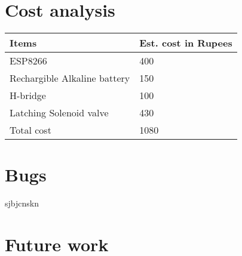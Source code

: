 \documentclass[16pt]{article}
\begin{document}
\section{Cost analysis}

\vspace{1cm}
\begin{tabular}{|m{5cm}|m{3.5cm}|}
	\hline
	{\bf Items} & {\bf Est. cost in Rupees}\\ \hline
	ESP8266 & 400 \\ \hline
	Rechargible Alkaline battery & 150 \\ \hline
	H-bridge & 100 \\ \hline 
	Latching Solenoid valve & 430 \\ \hline
	Total cost & 1080 \\ \hline 
\end{tabular} 

\vspace{15cm}
\section{Bugs}

sjbjcnskn

\vspace{19cm}

\section{Future work}
\end{document}
